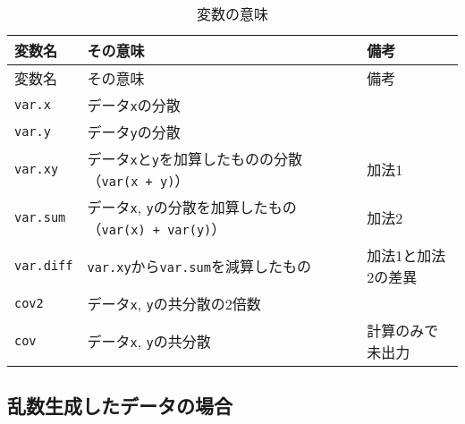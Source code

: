 \documentclass[]{tufte-handout}
\begin{document}
\newpage

\begin{longtable}[]{@{}lll@{}}
\caption{変数の意味}\tabularnewline
\toprule
変数名 & その意味 & 備考 \\
\midrule
\endfirsthead
\toprule
変数名 & その意味 & 備考 \\
\midrule
\endhead
\texttt{var.x} & データ\texttt{x}の分散 & \\
\texttt{var.y} & データ\texttt{y}の分散 & \\
\texttt{var.xy} &
データ\texttt{x}と\texttt{y}を加算したものの分散（\texttt{var(x\ +\ y)}）
& 加法1 \\
\texttt{var.sum} & データ\texttt{x},
\texttt{y}の分散を加算したもの（\texttt{var(x)\ +\ var(y)}） & 加法2 \\
\texttt{var.diff} & \texttt{var.xy}から\texttt{var.sum}を減算したもの &
加法1と加法2の差異 \\
\texttt{cov2} & データ\texttt{x}, \texttt{y}の共分散の2倍数 & \\
\texttt{cov} & データ\texttt{x}, \texttt{y}の共分散 &
計算のみで未出力 \\
\bottomrule
\end{longtable}

\newpage

\hypertarget{ux4e71ux6570ux751fux6210ux3057ux305fux30c7ux30fcux30bfux306eux5834ux5408}{%
\subsection{\texorpdfstring{\textbf{乱数生成したデータの場合}}{乱数生成したデータの場合}}\label{ux4e71ux6570ux751fux6210ux3057ux305fux30c7ux30fcux30bfux306eux5834ux5408}}
\end{document}
